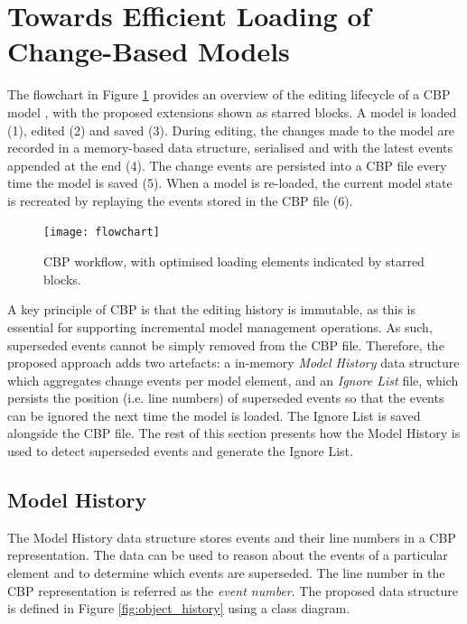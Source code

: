 \section{Towards Efficient Loading of Change-Based Models}
\label{sec:loading_time_optimisation}

The flowchart in Figure \ref{fig:flowchart} provides an overview of the editing lifecycle of a CBP model \cite{DBLP:conf/models/YohannisKP17}, with the proposed extensions shown as starred blocks. A model is loaded (1), edited (2) and saved (3).  During editing, the changes made to the model are recorded in a memory-based data structure, serialised and with the latest events appended at the end (4). The change events are persisted into a CBP file every time the model is saved (5). When a model is re-loaded, the current model state is recreated by replaying the events stored in the CBP file (6).

\begin{figure}[ht]
\centering
\texttt{[image: flowchart]}
\caption{CBP workflow, with optimised loading elements indicated by starred blocks.}
\label{fig:flowchart}
\end{figure}

A key principle of CBP is that the editing history is immutable, as this is essential for supporting incremental model management operations. As such, superseded events cannot be simply removed from the CBP file. Therefore, the proposed approach adds two artefacts: a in-memory \textit{Model History} data structure which aggregates change events per model element, and an \textit{Ignore List} file, which persists the position (i.e. line numbers) of superseded events so that the events can be ignored the next time the model is loaded. The Ignore List is saved alongside the CBP file. The rest of this section presents how the Model History is used to detect superseded events and generate the Ignore List.

\subsection{Model History}
\label{subsec:model_history}
The Model History data structure stores events and their line numbers in a CBP representation.  The data can be used to reason about the events of a particular element and to determine which events are superseded. The line number in the CBP representation is referred as the \textit{event number}. The proposed data structure is defined in Figure \ref{fig:object_history} using a class diagram.  

